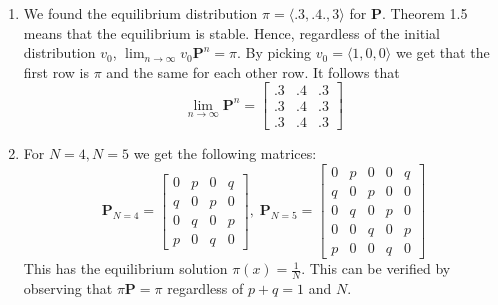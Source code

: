 \documentclass[14pt,letterpaper]{extarticle}
\newcommand*{\bP}{\mathbf{P}}
\begin{document}
\begin{center}
\begin{enumerate}
    From the graph, it is clear that states $\{0,1,2,3\}$ are transient and that $\{4,5\}$ are recurrent. Therefore the equilibrium $\pi=\langle 0,0,0,0,0.5,0.5\rangle$ is stable.
\item
    We found the equilibrium distribution $\pi=\langle .3,.4.,3\rangle$ for $\bP$. Theorem 1.5 means that the equilibrium is stable. Hence, regardless of the initial distribution $v_0$, $\lim_{n \to \infty} v_0\bP^n=\pi$. By picking $v_0=\langle 1,0,0\rangle$ we get that the first row is $\pi$ and the same for each other row. It follows that    \[ \lim_{n\to \infty}\bP^n=\begin{bmatrix}
        .3& .4 & .3\\
        .3& .4 & .3\\
        .3& .4 & .3
    \end{bmatrix}\]
\item
    For $N=4, N=5$ we get the following matrices:
    \[ \bP_{N=4}=\begin{bmatrix}
        0 & p & 0 & q \\
        q & 0 & p & 0 \\
        0 & q & 0 & p \\
        p & 0 & q & 0
    \end{bmatrix}, \; \bP_{N=5}=\begin{bmatrix}
        0 & p & 0 & 0 & q \\
        q & 0 & p & 0 & 0 \\
        0 & q & 0 & p & 0 \\
        0 & 0 & q & 0 & p \\
        p & 0 & 0 & q & 0 
    \end{bmatrix} \]
    This has the equilibrium solution $\pi(x)=\frac{1}{N}$. This can be verified by observing that $\pi\bP=\pi$ regardless of $p+q=1$ and $N$. \\

\end{enumerate}
\end{center}
\end{document}

